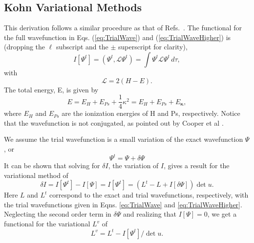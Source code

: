 \documentclass[preprint,showpacs,preprintnumbers,amsmath,amssymb,longbibliography,pra,aps]{revtex4-1}
\newcommand{\beq}{\begin{equation}}
\newcommand{\eeq}{\end{equation}}
\begin{document}
\subsection{Kohn Variational Methods}
\label{sec:Kohn}
This derivation follows a similar procedure as that of Refs.~\cite{Lucchese1989,Cooper2010,Armour1991,VanReethThesis}.
The functional for the full wavefunction in Eqs. (\ref{eq:TrialWave}) and (\ref{eq:TrialWaveHigher}) is (dropping the $\ell$ subscript and the $\pm$ superscript for clarity),
\begin{equation}
I[\Psi^t] = \left(\Psi^t, \mathcal{L} \Psi^t \right) = \int \Psi^t \mathcal{L} \Psi^t \,d\tau,
\label{eq:IlDefPsi}
\end{equation}
with
\beq
\mathcal{L} = 2(H - E).
\label{eq:LDef}
\eeq
The total energy, E, is given by
\begin{equation}
\label{eq:TotalEnergy}
E = E_H + E_{Ps} + \frac{1}{4}\kappa^2 = E_H + E_{Ps} + E_{\bm \kappa},
\end{equation}
where $E_H$ and $E_{Ps}$ are the ionization energies of H and Ps, respectively. Notice that the wavefunction is not conjugated, as pointed out by Cooper et al \cite{Cooper2010}.

We assume the trial wavefunction is a small variation of the exact wavefunction $\Psi$, or
\beq
\Psi^t = \Psi + \delta \Psi
\label{eq:PsiTrialRelation}
\eeq
It can be shown that solving for $\delta I$, the variation of $I$, gives a result for the variational method of
\beq
\delta I = I[\Psi^t] - I[\Psi] = I[\Psi^t] = (L^t - L + I[\delta \Psi]) \det u.
\label{eq:IlPsiVariation}
\eeq
Here $L$ and $L^t$ correspond to the exact and trial wavefunctions, respectively, with the trial wavefunctions given in Eqns. \ref{eq:TrialWave} and \ref{eq:TrialWaveHigher}. Neglecting the second order term in $\delta \Psi$ and realizing that $I[\Psi] = 0$, we get a functional for the variational $L^v$ of
\beq
L^v = L^t - I[\Psi^t] / \det u.
\label{eq:ComplexKohnVariation}
\eeq
\end{document}
